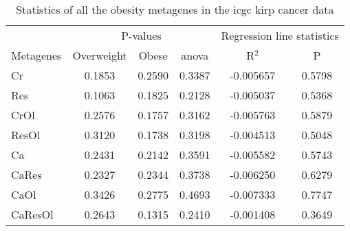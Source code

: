 \begin{appendices}
\begin{table}[htpb]
	\centering
	\caption[Statistics of all the obesity metagenes in the \gls{icgc} \acrshort{kirp} cancer data]{Statistics of all the obesity metagenes in the \gls{icgc} \gls{kirp} cancer data}
	\label{tab:degmetakirp}
	\begin{threeparttable}
		\begin{tabular}{lccccc}
			& \multicolumn{3}{c}{ P-values} & \multicolumn{2}{c}{ Regression line statistics}\\
			\cmidrule(r){2-4} \cmidrule(r){5-6}
			Metagenes &  Overweight &  Obese &  \gls{anova} &  R$^2$ &  P \\
			\hline
			\hline
			\rule{0pt}{2.25ex}Cr      & 0.1853                      & 0.2590  & 0.3387             & -0.005657  & 0.5798              \\
			Res     & 0.1063                      & 0.1825  & 0.2128             & -0.005037  & 0.5368              \\
			CrOl    & 0.2576                      & 0.1757  & 0.3162             & -0.005763  & 0.5879              \\
			ResOl   & 0.3120                      & 0.1738  & 0.3198             & -0.004513  & 0.5048              \\
			Ca      & 0.2431                      & 0.2142  & 0.3591             & -0.005582  & 0.5743              \\
			CaRes   & 0.2327                      & 0.2344  & 0.3738             & -0.006250  & 0.6279              \\
			CaOl    & 0.3426                      & 0.2775  & 0.4693             & -0.007333  & 0.7747             \\
			CaResOl & 0.2643                      & 0.1315  & 0.2410             & -0.001408  & 0.3649              \\
			\hline
			\hline
		\end{tabular}
	\end{threeparttable}
\end{table}


\end{appendices}
